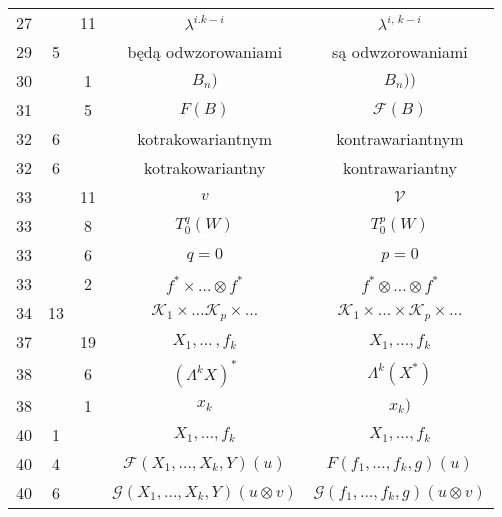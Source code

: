 \documentclass[a4paper,11pt]{article}
\newcommand{\mc}{\mathcal}
\newcommand{\ld}{\ldots}
\newcommand{\ti}{\times}
\newcommand{\ot}{\otimes}
\newcommand{\la}{\lambda}
\newcommand{\La}{\Lambda}
\newcommand{\F}{\mc{F}}
\newcommand{\G}{\mc{G}}
\newcommand{\K}{\mc{K}}
\newcommand{\V}{\mc{V}}
\begin{document}
\begin{center}
\begin{tabular}{|c|c|c|c|c|}
    27 & & 11 & $\la^{ i. k - i }$ & $\la^{ i,\, k - i }$ \\
    29 & 5 & & będą odwzorowaniami & są odwzorowaniami \\
    30 & & 1 & $B_{ n } )$ & $B_{ n } ) )$ \\
    31 & & 5 & $F( B )$ & $\F( B )$ \\
    32 & 6 & & kotrakowariantnym & kontrawariantnym \\
    32 & 6 & & kotrakowariantny & kontrawariantny \\
    33 & & 11 & $v$ & $\V$ \\
    33 & &  8 & $T_{ 0 }^{ q }( W )$ & $T_{ 0 }^{ p }( W )$ \\
    33 & &  6 & $q = 0$ & $p = 0$ \\
    33 & &  2 & $f^{ * } \ti \ld \ot f^{ * }$
           & $f^{ * } \ot \ld \ot f^{ * }$ \\
    34 & 13 & & $\K_{ 1 } \ti \ld \K_{ p } \ti \ld$
           & $\K_{ 1 } \ti \ld \ti \K_{ p } \ti \ld$ \\
    37 & & 19 & $X_{ 1 }, \ld\, , f_{ k }$ & $X_{ 1 }, \ld , f_{ k }$ \\
    38 & &  6 & $( \La^{ k } X )^{ * }$ & $\La^{ k }( X^{ * } )$ \\
    38 & &  1 & $x_{ k }$ & $x_{ k } )$ \\
    40 & 1 & & $X_{ 1 }, \! \ld , f_{ k }$ & $X_{ 1 }, \ld , f_{ k }$ \\
    40 & 4 & & $\F( X_{ 1 }, \ld, X_{ k }, Y )( u )$
           & $F( f_{ 1 }, \ld, f_{ k }, g )( u )$ \\
    40 & 6 & & $\G( X_{ 1 }, \ld, X_{ k }, Y )( u \ot v )$
           & $\G( f_{ 1 }, \ld, f_{ k }, g )( u \ot v )$ \\ \hline
  \end{tabular}


\end{center}
\end{document}
